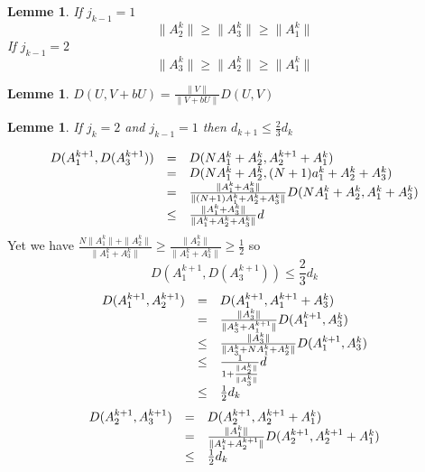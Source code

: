 \documentclass[12pt]{article}
\theoremstyle{plain}%
\newtheorem{lem}[thm]{Lemme}
\theoremstyle{definition}
\theoremstyle{remark}
\begin{document}
\begin{lem}
If $j_{k-1}=1$
\[
\|A_2^k \| \geq \|A_3^k\| \geq \|A_1^k \|
\]
If $j_{k-1}=2$
\[
\|A_3^k \| \geq \|A_2^k\| \geq \|A_1^k \|
\]
\end{lem}

\begin{lem}
 $D(U,V+b U)=\frac{\|V\|}{\|V+b U\|}D(U,V)$
\end{lem}
\begin{lem}
If $j_k=2$ and $j_{k-1}=1$ then $d_{k+1} \leq \frac{2}{3} d_k$
\end{lem}
\[
\begin{array}{c c l}
D(A_1^{k+1},D(A_3^{k+1})) & = & D(N A_1^k + A_2^k,A_2^{k+1}+A_1^k)\\
 & = & D(N A_1^k + A_2^k,(N+1)a_1^k+A_2^k+A_3^k) \\
 & = & \frac{\|A_1^k+A_3^k\|}{\|(N+1)A_1^k+A_2^k+A_3^k\|}D(NA_1^k+A_2^k,A_1^k+A_3^k)\\
 & \leq & \frac{\|A_1^k+A_3^k\|}{\|A_1^k+A_2^k+A_3^k\|} d
\end{array}
\]
Yet we have $\frac{N \|A_1^k\|+\|A_2^k\|}{\|A_1^k+A_3^k\|} \geq \frac{\|A_2^k\|}{\|A_1^k+A_3^k\|} \geq \frac{1}{2}$ so \[
D(A_1^{k+1},D(A_3^{k+1})) \leq \frac{2}{3} d_k
\]
\[
\begin{array}{c c l}
D(A_1^{k+1},A_2^{k+1}) & = & D(A_1^{k+1},A_1^{k+1}+A_3^k) \\
& = & \frac{\|A_3^k\|}{\|A_3^k+A_1^{k+1}\|}D(A_1^{k+1},A_3^k)\\
& \leq & \frac{\|A_3^k\|}{\|A_3^k+N A_1^k+A_2^k\|}D(A_1^{k+1},A_3^k)\\
& \leq & \frac{1}{1+\frac{\|A_2^k\|}{\|A_3^k\|}} d\\
& \leq & \frac{1}{2} d_k
\end{array}
\]
\[
\begin{array}{c c l}
D(A_2^{k+1},A_3^{k+1}) & = & D(A_2^{k+1},A_2^{k+1}+A_1^k) \\
& = &\frac{\|A_1^k\|}{\|A_1^k+A_2^{k+1}\|} D(A_2^{k+1},A_2^{k+1}+A_1^k)\\
& \leq & \frac{1}{2} d_k
\end{array}
\]
\end{document}
